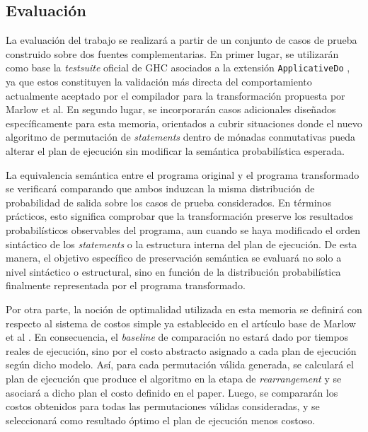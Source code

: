 \newpage

\subsection*{Evaluación}\label{sec:eval}

La evaluación del trabajo se realizará a partir de un conjunto de casos de prueba construido sobre dos fuentes complementarias. En primer lugar, se utilizarán como base la \textit{testsuite} oficial de \textsf{GHC} asociados a la extensión \texttt{ApplicativeDo} \cite{GHCApplicativeDoTestsuite}, ya que estos constituyen la validación más directa del comportamiento actualmente aceptado por el compilador para la transformación propuesta por Marlow et al. En segundo lugar, se incorporarán casos adicionales diseñados específicamente para esta memoria, orientados a cubrir situaciones donde el nuevo algoritmo de permutación de \textit{statements} dentro de mónadas conmutativas pueda alterar el plan de ejecución sin modificar la semántica probabilística esperada.

La equivalencia semántica entre el programa original y el programa transformado se verificará comparando que ambos induzcan la misma distribución de probabilidad de salida sobre los casos de prueba considerados. En términos prácticos, esto significa comprobar que la transformación preserve los resultados probabilísticos observables del programa, aun cuando se haya modificado el orden sintáctico de los \textit{statements} o la estructura interna del plan de ejecución. De esta manera, el objetivo específico de preservación semántica se evaluará no solo a nivel sintáctico o estructural, sino en función de la distribución probabilística finalmente representada por el programa transformado.

Por otra parte, la noción de optimalidad utilizada en esta memoria se definirá con respecto al sistema de costos simple ya establecido en el artículo base de Marlow et al \cite{MarlowPJKM2016}. En consecuencia, el \textit{baseline} de comparación no estará dado por tiempos reales de ejecución, sino por el costo abstracto asignado a cada plan de ejecución según dicho modelo. Así, para cada permutación válida generada, se calculará el plan de ejecución que produce el  algoritmo en la etapa de \textit{rearrangement} y se asociará a dicho plan el costo definido en el paper. Luego, se compararán los costos obtenidos para todas las permutaciones válidas consideradas, y se seleccionará como resultado óptimo el plan de ejecución menos costoso.